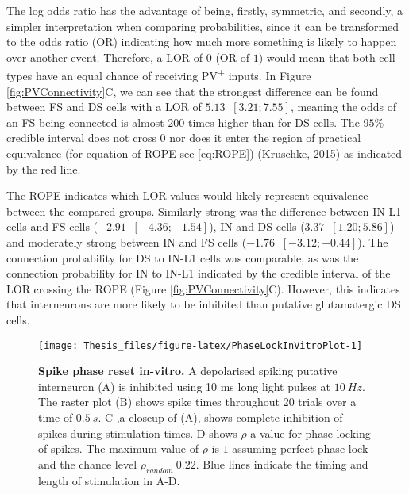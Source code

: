 \documentclass[
  12pt,
  a4paper,
  openany]{book}
\begin{document}
The log odds ratio has the advantage of being, firstly, symmetric, and secondly, a simpler interpretation when comparing probabilities, since it can be transformed to the odds ratio (OR) indicating how much more something is likely to happen over another event. Therefore, a LOR of \(0\) (OR of \(1\)) would mean that both cell types have an equal chance of receiving PV\textsuperscript{+} inputs. In Figure \ref{fig:PVConnectivity}C, we can see that the strongest difference can be found between FS and DS cells with a LOR of \(5.13\ \) \([3.21; 7.55]\), meaning the odds of an FS being connected is almost \(200\) times higher than for DS cells. The \(95\%\) credible interval does not cross \(0\) nor does it enter the region of practical equivalence (for equation of ROPE see \eqref{eq:ROPE}) (\protect\hyperlink{ref-kruschke_doing_2015}{Kruschke, 2015}) as indicated by the red line.

The ROPE indicates which LOR values would likely represent equivalence between the compared groups. Similarly strong was the difference between IN-L1 cells and FS cells (\(-2.91\ \) \([-4.36; -1.54]\)), IN and DS cells (\(3.37\ \) \([1.20; 5.86]\)) and moderately strong between IN and FS cells (\(-1.76\ \) \([-3.12; -0.44]\)). The connection probability for DS to IN-L1 cells was comparable, as was the connection probability for IN to IN-L1 indicated by the credible interval of the LOR crossing the ROPE (Figure \ref{fig:PVConnectivity}C). However, this indicates that interneurons are more likely to be inhibited than putative glutamatergic DS cells.




\begin{figure}[htbp]

{\centering \texttt{[image: Thesis\_files/figure-latex/PhaseLockInVitroPlot-1]} 

}

\caption[Spike phase reset \emph{in-vitro}]{\textbf{Spike phase reset in-vitro.} A depolarised spiking putative interneuron (A) is inhibited using 10 ms long light pulses at \(10\ Hz\). The raster plot (B) shows spike times throughout 20 trials over a time of \(0.5\ s\). C ,a closeup of (A), shows complete inhibition of spikes during stimulation times. D shows \(\rho\) a value for phase locking of spikes. The maximum value of \(\rho\) is \(1\) assuming perfect phase lock and the chance level \(\rho_{random}\ 0.22\). Blue lines indicate the timing and length of stimulation in A-D.}\label{fig:PhaseLockInVitroPlot}
\end{figure}
\end{document}
